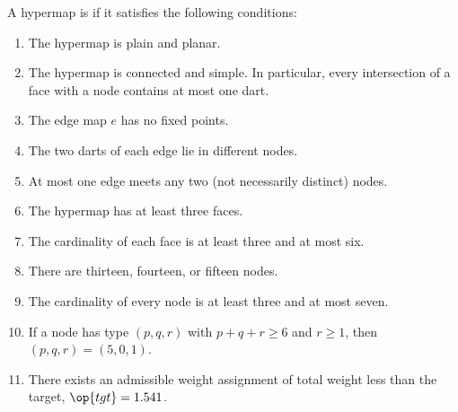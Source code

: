 \begin{definition}[tame]\label{definition:tame}
A hypermap is  if it satisfies the following conditions:
%
%
\begin{enumerate}\wasitemize 
\item {}  
The hypermap is plain and planar.
\item {} 
The hypermap is connected and simple.  In
  particular, every intersection of a face with a node contains at
  most one dart.
\item {} 
The edge map $e$ has no fixed points.
\item {} 
The two darts of each edge lie in different nodes.
\item {} 
At most one edge meets any two (not necessarily distinct) nodes.
\item {} 
  The hypermap has at least three faces.
\item {}
The cardinality of each face is at least three  and at most six.
\item {} 
There are  thirteen, fourteen, or fifteen nodes.
\item {} 
The cardinality of every node is at least three
  and at most seven.
\item {} 
If a node has type $(p,q,r)$ with $p+q+r\ge 6$ and $r\ge 1$, then $(p,q,r)=(5,0,1)$. 
\item {} 
There exists an admissible weight assignment
of total weight less than the target, $\op{tgt}=1.541$.
\end{enumerate}\wasitemize 
\end{definition}
%
%
%
%
%
%
%
%

